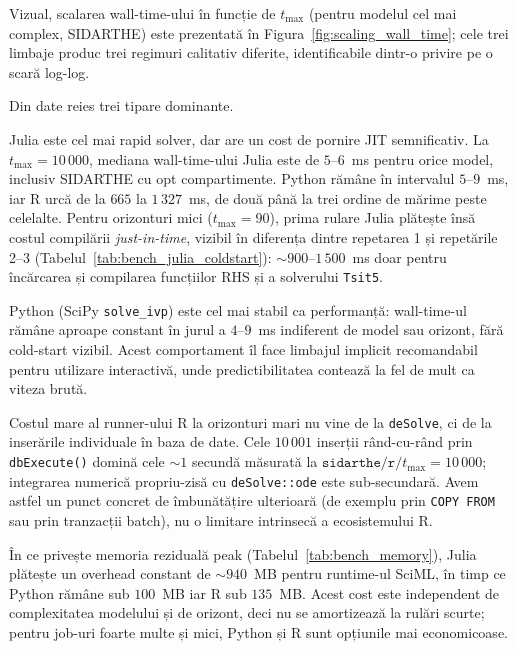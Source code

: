



Vizual, scalarea wall-time-ului în funcție de $t_{\max}$ (pentru modelul cel
mai complex, SIDARTHE) este prezentată în
Figura~\ref{fig:scaling_wall_time}; cele trei limbaje produc trei regimuri
calitativ diferite, identificabile dintr-o privire pe o scară log-log.



Din date reies trei tipare dominante.

Julia este cel mai rapid solver, dar are un cost de pornire JIT
semnificativ. La $t_{\max}=10\,000$, mediana wall-time-ului Julia este de
$5$--$6$~ms pentru orice model, inclusiv SIDARTHE cu opt compartimente.
Python rămâne în intervalul $5$--$9$~ms, iar R urcă de la $665$ la $1\,327$~ms,
de două până la trei ordine de mărime peste celelalte. Pentru orizonturi mici
($t_{\max}=90$), prima rulare Julia plătește însă costul compilării
\emph{just-in-time}, vizibil în diferența dintre repetarea 1 și repetările 2--3
(Tabelul~\ref{tab:bench_julia_coldstart}): $\sim$$900$--$1\,500$~ms doar
pentru încărcarea și compilarea funcțiilor RHS și a solverului
\texttt{Tsit5}.



Python (SciPy \texttt{solve\_ivp}) este cel mai stabil ca performanță:
wall-time-ul rămâne aproape constant în jurul a $4$--$9$~ms indiferent de
model sau orizont, fără cold-start vizibil. Acest comportament îl face
limbajul implicit recomandabil pentru utilizare interactivă, unde
predictibilitatea contează la fel de mult ca viteza brută.

Costul mare al runner-ului R la orizonturi mari nu vine de la \texttt{deSolve},
ci de la inserările individuale în baza de date. Cele $10\,001$ inserții
rând-cu-rând prin \texttt{dbExecute()} domină cele $\sim$$1$ secundă măsurată
la $\texttt{sidarthe}/\texttt{r}/t_{\max}=10\,000$; integrarea numerică
propriu-zisă cu \texttt{deSolve::ode} este sub-secundară. Avem astfel un
punct concret de îmbunătățire ulterioară (de exemplu prin \texttt{COPY FROM}
sau prin tranzacții batch), nu o limitare intrinsecă a ecosistemului R.

În ce privește memoria reziduală peak (Tabelul~\ref{tab:bench_memory}), Julia
plătește un overhead constant de $\sim$$940$~MB pentru runtime-ul SciML, în
timp ce Python rămâne sub $100$~MB iar R sub $135$~MB. Acest cost este
independent de complexitatea modelului și de orizont, deci nu se amortizează
la rulări scurte; pentru job-uri foarte multe și mici, Python și R sunt
opțiunile mai economicoase.

